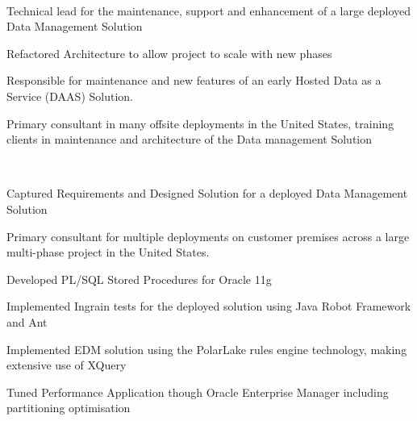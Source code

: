 \documentclass[letterpaper]{deedy-resume} %
\begin{document}
\begin{minipage}[t]{0.66\textwidth}
\begin{tightitemize}
\end{tightitemize}

\sectionspace %



\\
 
\begin{tightitemize}
	
	\item Technical lead for the maintenance, support and enhancement of a large deployed Data Management Solution
	\item Refactored Architecture to allow project to scale with new phases
	\item Responsible for maintenance and new features of an early Hosted Data as a Service (DAAS) Solution.
	\item Primary consultant in many offsite deployments in the United States, training clients in maintenance and architecture of the Data management Solution
	
\end{tightitemize}

\sectionspace %


\\
 
\begin{tightitemize}
	
	\item Captured Requirements and Designed Solution for a deployed Data Management Solution
	\item Primary consultant for multiple deployments on customer premises across a large multi-phase project in the United States.
	\item Developed PL/SQL Stored Procedures for Oracle 11g
	\item Implemented Ingrain tests for the deployed solution using Java Robot Framework and Ant
	\item Implemented EDM solution using the PolarLake rules engine technology, making extensive use of XQuery
	\item Tuned Performance Application though Oracle Enterprise Manager including partitioning optimisation
	

\end{tightitemize}
\end{minipage}
\end{document}
